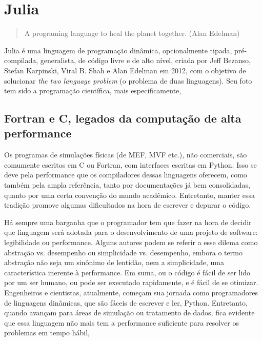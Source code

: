 \chapter{Julia}

\begin{quotation}
    A programing language to heal the planet together.
    (Alan Edelman)
\end{quotation}

Julia é uma linguagem de programação dinâmica, opcionalmente tipada, pré-compilada, generalista, de código livre\footnotemark{} e de alto nível, criada por Jeff Bezanso, Stefan Karpinski, Viral B. Shah e Alan Edelman em 2012, com o objetivo de solucionar \emph{the two language problem} (o problema de duas linguagens). Seu foto tem sido a programação científica, mais especificamente,  \cite[Capítulo: The scope of Julia]{Sherrington}



\section{Fortran e C, legados da computação de alta performance}

Os programas de simulações físicas (de MEF, MVF etc.), não comerciais, são comumente escritos em C ou Fortran, com interfaces escritas em Python. Isso se deve pela performance que os compiladores dessas linguagens oferecem, como também pela ampla referência, tanto por documentações já bem consolidadas, quanto por uma certa convenção do mundo acadêmico. Entretanto, manter essa tradição promove algumas dificultados na hora de escrever e depurar o código.


Há sempre uma barganha que o programador tem que fazer na hora de decidir que linguagem será adotada para o desenvolvimento de uma projeto de software: legibilidade ou performance. Alguns autores podem se referir a esse dilema como abstração vs. desempenho ou simplicidade vs. desempenho, embora o termo abstração não seja um sinônimo de lentidão, nem a simplicidade, uma característica inerente à performance. Em suma, ou o código é fácil de ser lido por um ser humano, ou pode ser executado rapidamente, e é fácil de se otimizar. Engenheiros e cientistas, atualmente, começam sua jornada como programadores de linguagens dinâmicas, que são fáceis de escrever e ler, Python. Entretanto, quando avançam para áreas de simulação ou tratamento de dados, fica evidente que essa linguagem não mais tem a performance suficiente para resolver os problemas em tempo hábil,

